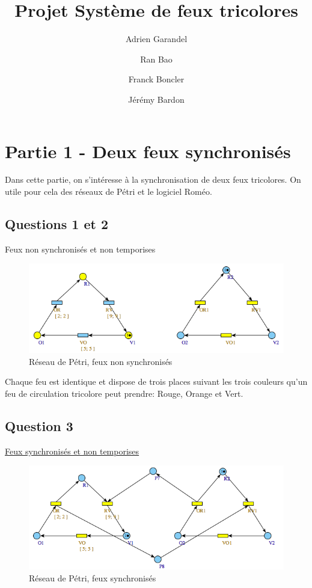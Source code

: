 \documentclass[11pt]{article}
\title{Projet Système de feux tricolores}
\author{Adrien Garandel \and Ran Bao \and Franck Boncler \and Jérémy Bardon}
\begin{document}
\maketitle
\tableofcontents
\newpage

\section{Partie 1 - Deux feux synchronisés}
Dans cette partie, on s'intéresse à la synchronisation de deux feux tricolores. On utile pour cela des réseaux de Pétri et le logiciel Roméo.

\subsection{Questions 1 et 2}
Feux non synchronisés et non temporises

\begin{figure}[H]
	\centering
	\includegraphics[width=1\textwidth]{ressources/part1/Q2.png}
	\caption{Réseau de Pétri, feux non synchronisés}
\end{figure}

Chaque feu est identique et dispose de trois places suivant les trois couleurs qu'un feu de circulation tricolore peut prendre: Rouge, Orange et Vert.

\subsection{Question 3}

\href{https://github.com/masters-info-nantes/hong-cheng-lv/blob/master/ressources/part1/Q3-FeuxSynchro.xml}{Feux
synchronisés et non temporises}

\begin{figure}[H]
	\centering
	\includegraphics[width=1\textwidth]{ressources/part1/Q3.png}
	\caption{Réseau de Pétri, feux synchronisés}
\end{figure}
\end{document}
